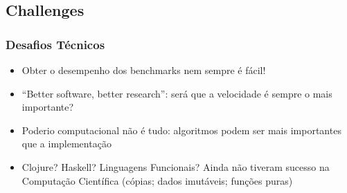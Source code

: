 \documentclass{beamer}
\begin{document}
\begin{darkframes}
  \section{Challenges}
  \begin{frame}
    \frametitle{Desafios Técnicos}
    \begin{itemize}
    \item<2-> Obter o desempenho dos benchmarks nem sempre é fácil!
    \item<3-> ``Better software, better research'': será que a velocidade é sempre o mais importante?
    \item<4-> Poderio computacional não é tudo: algoritmos podem ser mais importantes que a implementação
    \item<5-> Clojure? Haskell? Linguagens Funcionais? Ainda não tiveram sucesso na Computação Científica (cópias; dados imutáveis; funções puras) 
    \end{itemize}
  \end{frame}


\end{darkframes}
\end{document}
